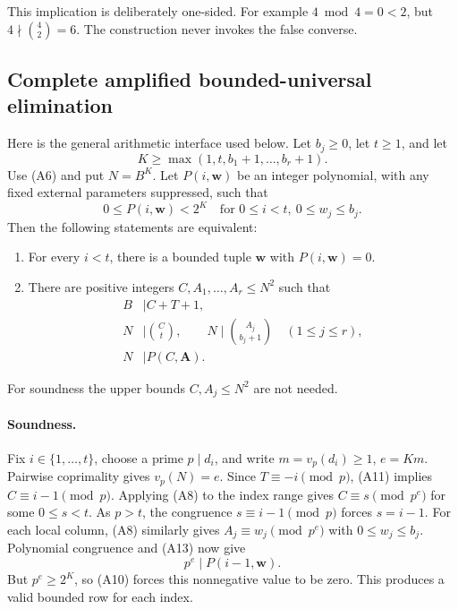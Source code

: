 This implication is deliberately one-sided.  For example \(4\bmod4=0<2\),
but \(4\nmid\binom42=6\).  The construction never invokes the false converse.

\subsection{Complete amplified bounded-universal elimination}

Here is the general arithmetic interface used below.  Let \(b_j\ge0\),
let \(t\ge1\), and let
\[
 K\ge\max(1,t,b_1+1,\ldots,b_r+1).
\]
Use (A6) and put \(N=B^K\).  Let \(P(i,\mathbf w)\) be an integer
polynomial, with any fixed external parameters suppressed, such that
\[
 0\le P(i,\mathbf w)<2^K
 \quad\text{for }0\le i<t,\ 0\le w_j\le b_j.              \tag{A10}
\]
Then the following statements are equivalent:
\begin{enumerate}
\item For every \(i<t\), there is a bounded tuple \(\mathbf w\) with
\(P(i,\mathbf w)=0\).
\item There are positive integers \(C,A_1,\ldots,A_r\le N^2\) such that
\begin{align}
 B&\mid C+T+1,                                         \tag{A11}\\
 N&\mid\binom Ct,\qquad
 N\mid\binom{A_j}{b_j+1}\quad(1\le j\le r),              \tag{A12}\\
 N&\mid P(C,\mathbf A).                                \tag{A13}
\end{align}
\end{enumerate}
For soundness the upper bounds \(C,A_j\le N^2\) are not needed.

\paragraph{Soundness.}
Fix \(i\in\{1,\ldots,t\}\), choose a prime \(p\mid d_i\), and write
\(m=v_p(d_i)\ge1\), \(e=Km\).  Pairwise coprimality gives
\(v_p(N)=e\).  Since \(T\equiv-i\pmod p\), (A11) implies
\(C\equiv i-1\pmod p\).  Applying (A8) to the index range gives
\(C\equiv s\pmod{p^e}\) for some \(0\le s<t\).
As \(p>t\), the congruence \(s\equiv i-1\pmod p\) forces \(s=i-1\).
For each local column, (A8) similarly gives
\(A_j\equiv w_j\pmod{p^e}\) with \(0\le w_j\le b_j\).
Polynomial congruence and (A13) now give
\[
 p^e\mid P(i-1,\mathbf w).
\]
But \(p^e\ge2^K\), so (A10) forces this nonnegative value to be zero.
This produces a valid bounded row for each index.

